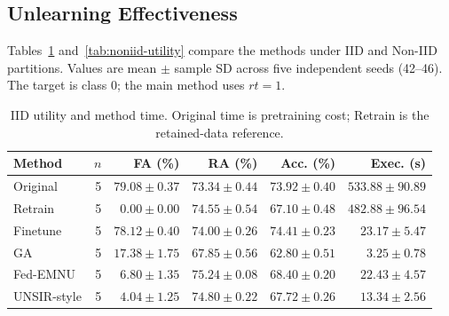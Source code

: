 \documentclass[software,article,submit,moreauthors]{Definitions/mdpi}
\begin{document}
\subsection{Unlearning Effectiveness}
\label{sec:effectiveness}
Tables~\ref{tab:iid-utility} and~\ref{tab:noniid-utility} compare the methods
under IID and Non-IID partitions. Values are mean $\pm$ sample SD across five
independent seeds (42--46). The target is class 0; the main method uses $rt=1$.
\begin{table}[H]\centering\small
\caption{IID utility and method time. Original time is pretraining cost; Retrain is the retained-data reference.}
\label{tab:iid-utility}
\begin{tabular}{lrrrrr}\toprule Method & $n$ & FA (\%) & RA (\%) & Acc. (\%) & Exec. (s)\\\midrule
Original & 5 & $79.08 \pm 0.37$ & $73.34 \pm 0.44$ & $73.92 \pm 0.40$ & $533.88 \pm 90.89$\\
Retrain & 5 & $0.00 \pm 0.00$ & $74.55 \pm 0.54$ & $67.10 \pm 0.48$ & $482.88 \pm 96.54$\\
Finetune & 5 & $78.12 \pm 0.40$ & $74.00 \pm 0.26$ & $74.41 \pm 0.23$ & $23.17 \pm 5.47$\\
GA & 5 & $17.38 \pm 1.75$ & $67.85 \pm 0.56$ & $62.80 \pm 0.51$ & $3.25 \pm 0.78$\\
Fed-EMNU & 5 & $6.80 \pm 1.35$ & $75.24 \pm 0.08$ & $68.40 \pm 0.20$ & $22.43 \pm 4.57$\\
UNSIR-style & 5 & $4.04 \pm 1.25$ & $74.80 \pm 0.22$ & $67.72 \pm 0.26$ & $13.34 \pm 2.56$\\
\bottomrule\end{tabular}\end{table}
\end{document}
